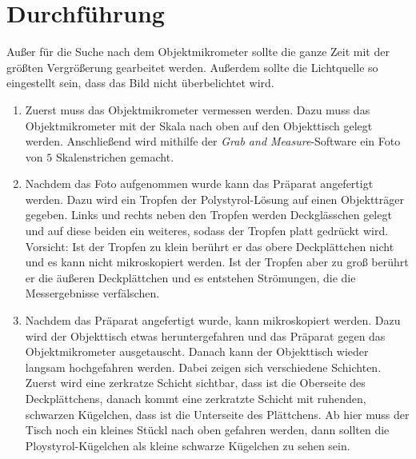 \section*{Durchführung}

Außer für die Suche nach dem Objektmikrometer sollte die ganze Zeit mit der größten Vergrößerung gearbeitet werden. Außerdem sollte die Lichtquelle so eingestellt sein, dass das Bild nicht überbelichtet wird.
\begin{enumerate}

  \item Zuerst muss das Objektmikrometer vermessen werden. Dazu muss das Objektmikrometer mit der Skala nach oben auf den Objekttisch gelegt werden. Anschließend wird mithilfe der \emph{Grab and Measure}-Software ein Foto von $5$ Skalenstrichen gemacht.

  \item Nachdem das Foto aufgenommen wurde kann das Präparat angefertigt werden. Dazu wird ein Tropfen der Polystyrol-Lösung auf einen Objektträger gegeben. Links und rechts neben den Tropfen werden Deckglässchen gelegt und auf diese beiden ein weiteres, sodass der Tropfen platt gedrückt wird. Vorsicht: Ist der Tropfen zu klein berührt er das obere Deckplättchen nicht und es kann nicht mikroskopiert werden. Ist der Tropfen aber zu groß berührt er die äußeren Deckplättchen und es entstehen Strömungen, die die Messergebnisse verfälschen.

  \item Nachdem das Präparat angefertigt wurde, kann mikroskopiert werden. Dazu wird der Objekttisch etwas heruntergefahren und das Präparat gegen das Objektmikrometer ausgetauscht. Danach kann der Objekttisch wieder langsam hochgefahren werden. Dabei zeigen sich verschiedene Schichten. Zuerst wird eine zerkratze Schicht sichtbar, dass ist die Oberseite des Deckplättchens, danach kommt eine zerkratzte Schicht mit ruhenden, schwarzen Kügelchen, dass ist die Unterseite des Plättchens. Ab hier muss der Tisch noch ein kleines Stückl nach oben gefahren werden, dann sollten die Ploystyrol-Kügelchen als kleine schwarze Kügelchen zu sehen sein.


\end{enumerate}
